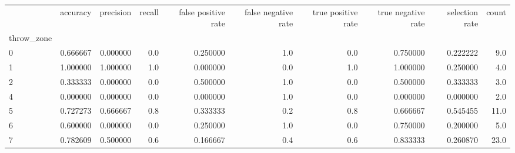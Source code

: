 \begin{tabular}{lrrrrrrrrr}
\toprule
{} &  accuracy &  precision &  recall &  false positive rate &  false negative rate &  true positive rate &  true negative rate &  selection rate &  count \\
throw\_zone &           &            &         &                      &                      &                     &                     &                 &        \\
\midrule
0          &  0.666667 &   0.000000 &     0.0 &             0.250000 &                  1.0 &                 0.0 &            0.750000 &        0.222222 &    9.0 \\
1          &  1.000000 &   1.000000 &     1.0 &             0.000000 &                  0.0 &                 1.0 &            1.000000 &        0.250000 &    4.0 \\
2          &  0.333333 &   0.000000 &     0.0 &             0.500000 &                  1.0 &                 0.0 &            0.500000 &        0.333333 &    3.0 \\
4          &  0.000000 &   0.000000 &     0.0 &             0.000000 &                  1.0 &                 0.0 &            0.000000 &        0.000000 &    2.0 \\
5          &  0.727273 &   0.666667 &     0.8 &             0.333333 &                  0.2 &                 0.8 &            0.666667 &        0.545455 &   11.0 \\
6          &  0.600000 &   0.000000 &     0.0 &             0.250000 &                  1.0 &                 0.0 &            0.750000 &        0.200000 &    5.0 \\
7          &  0.782609 &   0.500000 &     0.6 &             0.166667 &                  0.4 &                 0.6 &            0.833333 &        0.260870 &   23.0 \\
\bottomrule
\end{tabular}
